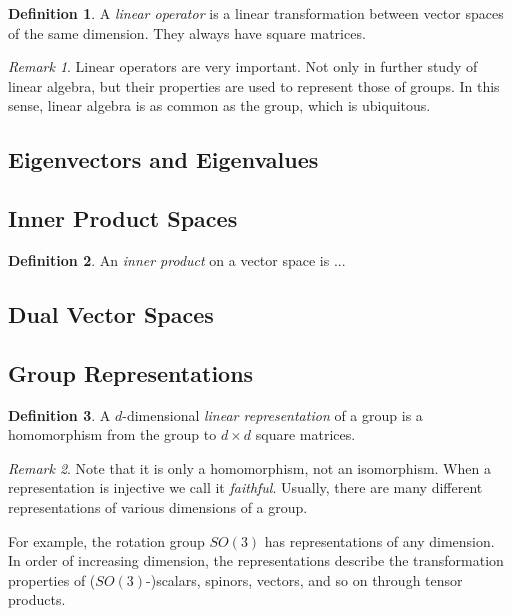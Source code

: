 \documentclass[12pt]{article}
\theoremstyle{definition}
\newtheorem{definition}{Definition}[section]
\theoremstyle{remark}
\newtheorem*{remark}{Remark}
\theoremstyle{example}
\theoremstyle{theorem}
\theoremstyle{lemma}
\begin{document}
\begin{definition}
	A \textit{linear operator} is a linear transformation between vector spaces of the same dimension. They always have square matrices.
\end{definition}

\begin{remark}
	Linear operators are very important. Not only in further study of linear algebra, but their properties are used to represent those of groups. In this sense, linear algebra is as common as the group, which is ubiquitous.
\end{remark}

\subsection{Eigenvectors and Eigenvalues}

\subsection{Inner Product Spaces}

\begin{definition}
	An \textit{inner product} on a vector space is ...
\end{definition}

\subsection{Dual Vector Spaces}

\subsection{Group Representations}

\begin{definition}
	A $d$-dimensional \textit{linear representation} of a group is a homomorphism from the group to $d\times d$ square matrices.
\end{definition}

\begin{remark}
	Note that it is only a homomorphism, not an isomorphism. When a representation is injective we call it \textit{faithful}. Usually, there are many different representations of various dimensions of a group.
	
	For example, the rotation group $SO(3)$ has representations of any dimension. In order of increasing dimension, the representations describe the transformation properties of ($SO(3)$-)scalars, spinors, vectors, and so on through tensor products.
\end{remark}
\end{document}
